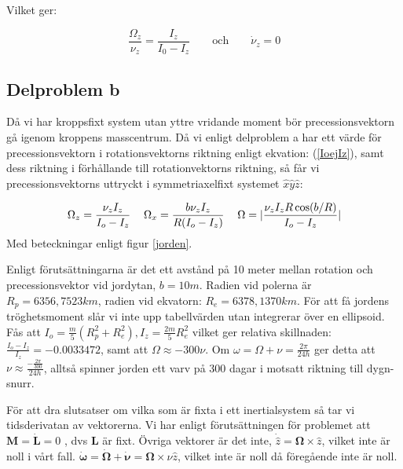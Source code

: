 \documentclass[12pt,a4paper]{article}
\begin{document}
	Vilket ger:
	
	\begin{equation}
		\frac{\Omega_z}{\nu_z} = \frac{I_z}{I_0 - I_z}
		\hspace{24pt}
		\mathrm{och}
		\hspace{24pt}
		\dot{\nu}_z = 0
\label{IoejIz}
	\end{equation}
	\subsection{Delproblem b}
	Då vi har kroppsfixt system utan yttre vridande moment bör precessionsvektorn
	gå igenom kroppens masscentrum.  Då vi enligt delproblem a har ett värde för
	precessionsvektorn i rotationsvektorns riktning enligt ekvation: (\ref{IoejIz}), samt dess
	riktning i förhållande till rotationvektorns riktning, så får vi precessionsvektorns
	uttryckt i symmetriaxelfixt systemet $\hat{x}\hat{y}\hat{z}$:
	
	\begin{equation*}
		\Omega_z = \frac{\nu_z I_z}{I_o-I_z}
		\hspace{12pt}
		\Omega_x = \frac{b \nu_z I_z}{R(I_o-I_z)}
		\hspace{12pt}
		\Omega = \arrowvert\frac{\nu_z I_z R \cos(b/R)}{I_o-I_z}\arrowvert
	\end{equation*}
	Med beteckningar enligt figur \ref{jorden}.

	Enligt förutsättningarna är det ett avstånd på 10 meter mellan rotation och
	precessionsvektor vid jordytan, $b=10m$. Radien vid polerna är $R_p= 6356,7523 km$,
	radien vid ekvatorn: $R_e=6378,1370 km$. För att få jordens tröghetsmoment slår vi
	inte upp tabellvärden utan integrerar över en ellipsoid.
	Fås att $I_o = \frac{m}{5}(R_p^2+R_e^2), I_z = \frac{2m}{5}R_e^2$ vilket ger relativa
	skillnaden: $\frac{I_o-I_z}{I_z} = -0.0033472$, samt att $\Omega \approx -300\nu$. Om
	$\omega=\Omega+\nu = \frac{2\pi}{24h}$ ger detta att
	$\nu \approx \frac{-\frac{2\pi}{300}}{24h}$, alltså spinner jorden ett varv på 300
	dagar i motsatt riktning till dygn-snurr.

	
	För att dra slutsatser om vilka som är fixta i ett inertialsystem så tar vi tidsderivatan av
	vektorerna. Vi har enligt förutsättningen för problemet att $\mathbf{M} = \dot{\mathbf{L}}=0$ ,
	dvs $\mathbf{L}$ är fixt. Övriga vektorer är det inte, $\dot{\hat{z}}=\boldsymbol{\Omega} \times \hat{z}$,
	vilket inte är noll i vårt fall. $\dot{\boldsymbol{\omega}} = \dot{\boldsymbol{\Omega}}+\dot{\boldsymbol{\nu}} =
	\boldsymbol{\Omega} \times \nu \hat{z}$, vilket inte är noll då föregående inte är noll.
	
\end{document}
